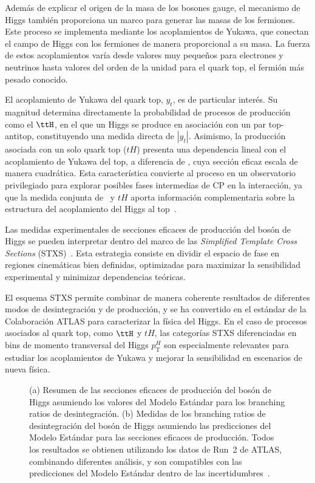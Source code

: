 Además de explicar el origen de la masa de los bosones gauge, el mecanismo de Higgs también proporciona un marco para generar las masas de los fermiones. Este proceso se implementa mediante los acoplamientos de Yukawa, que conectan el campo de Higgs con los fermiones de manera proporcional a su masa. La fuerza de estos acoplamientos varía desde valores muy pequeños para electrones y neutrinos hasta valores del orden de la unidad para el quark top, el fermión más pesado conocido.  

El acoplamiento de Yukawa del quark top, \(y_{t}\), es de particular interés. Su magnitud determina directamente la probabilidad de procesos de producción como el \(\ttH\), en el que un Higgs se produce en asociación con un par top-antitop, constituyendo una medida directa de \(|y_{t}|\). Asimismo, la producción asociada con un solo quark top (\(tH\)) presenta una dependencia lineal con el acoplamiento de Yukawa del top, a diferencia de \ttH, cuya sección eficaz escala de manera cuadrática. Esta característica convierte al proceso en un observatorio privilegiado para explorar posibles fases intermedias de CP en la interacción, ya que la medida conjunta de \ttH\ y \(tH\) aporta información complementaria sobre la estructura del acoplamiento del Higgs al top~\cite{Bernreuther:2002uj,Brod:2013cka}. 

Las medidas experimentales de secciones eficaces de producción del bosón de Higgs se pueden interpretar dentro del marco de las \textit{Simplified Template Cross Sections} (STXS)~\cite{badger2016leshouches2015physics,STXS11}. Esta estrategia consiste en dividir el espacio de fase en regiones cinemáticas bien definidas, optimizadas para maximizar la sensibilidad experimental y minimizar dependencias teóricas.  

El esquema STXS permite combinar de manera coherente resultados de diferentes modos de desintegración y de producción, y se ha convertido en el estándar de la Colaboración ATLAS para caracterizar la física del Higgs. En el caso de procesos asociados al quark top, como \(\ttH\) y \(tH\), las categorías STXS diferenciadas en bins de momento transversal del Higgs \(p_{\text{T}}^{H}\) son especialmente relevantes para estudiar los acoplamientos de Yukawa y mejorar la sensibilidad en escenarios de nueva física.  

\begin{figure}[htbp]
  \centering
  \hfill
  \caption{(a) Resumen de las secciones eficaces de producción del bosón de Higgs asumiendo los valores del Modelo Estándar para los branching ratios de desintegración.
  (b) Medidas de los branching ratios de desintegración del bosón de Higgs asumiendo las predicciones del Modelo Estándar para las secciones eficaces de producción.
  Todos los resultados se obtienen utilizando los datos de Run~2 de ATLAS, combinando diferentes análisis, y son compatibles con las predicciones del Modelo Estándar dentro de las incertidumbres~\cite{Nature_ATLAS}.}
  \label{res:higgs_mu}
\end{figure}


